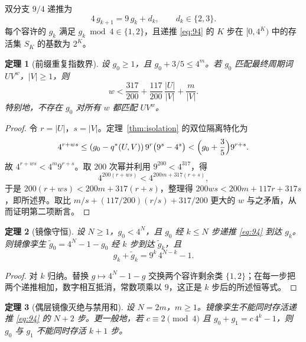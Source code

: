\documentclass[11pt,a4paper]{article}
\newtheorem{theorem}{定理}[section]
\theoremstyle{remark}
\begin{document}
双分支 $9/4$ 递推为
\begin{equation}
  4\, g_{k+1} = 9\, g_{k} + d_{k}, \qquad d_{k} \in \{2,3\}.
  \label{eq:94}
\end{equation}
每个容许的 $g_{k}$ 满足 $g_{k} \bmod 4 \in \{1,2\}$，且递推 \eqref{eq:94} 的 $K$ 步在 $[0,4^{K})$ 中的存活集 $S_{K}$ 的基数为 $2^{K}$。

\begin{theorem}[前缀重复指数界]
\label{thm:94rep}
设 $g_{0} \ge 1$，且 $g_{0} + 3/5 \le 4^{m}$。若 $g_{0}$ 匹配最终周期词 $U V^{w}$，$|V| \ge 1$，则
\[
  w < \frac{317}{200} + \frac{117}{200}\,\frac{|U|}{|V|} + \frac{m}{|V|}.
\]
特别地，不存在 $g_{0}$ 对所有 $w$ 都匹配 $U V^{w}$。
\end{theorem}

\begin{proof}
令 $r = |U|$，$s = |V|$。定理~\ref{thm:isolation} 的双位隔离特化为
\[
  4^{r+ws} \le (g_{0} - q^{*}(U,V))\, 9^{r}\bigl(9^{s} - 4^{s}\bigr) < \Bigl(g_{0} + \frac35\Bigr) 9^{r+s}.
\]
故 $4^{r+ws} < 4^{m} 9^{r+s}$。取 $200$ 次幂并利用 $9^{200} < 4^{317}$，得
\[
  4^{200(r+ws)} < 4^{200m + 317(r+s)},
\]
于是 $200(r+ws) < 200m + 317(r+s)$，整理得 $200ws < 200m + 117r + 317s$，即所述界。取比 $m/s + (117/200)(r/s) + 317/200$ 更大的 $w$ 与之矛盾，从而证明第二项断言。
\end{proof}

\begin{theorem}[镜像守恒]
\label{thm:mirror}
设 $N \ge 1$，$g_{0} < 4^{N}$，且 $g_{0}$ 经 $k \le N$ 步递推 \eqref{eq:94} 到达 $g_{k}$。则镜像孪生 $\tilde g_{0} = 4^{N} - 1 - g_{0}$ 经 $k$ 步到达 $\tilde g_{k}$，且
\[
  g_{k} + \tilde g_{k} = 9^{k}\, 4^{N-k} - 1.
\]
\end{theorem}

\begin{proof}
对 $k$ 归纳。替换 $g \mapsto 4^{N} - 1 - g$ 交换两个容许剩余类 $\{1,2\}$；在每一步把两个递推相加，数字相互抵消，常数项乘以 $9$，这正是 $k$ 步后的所述恒等式。
\end{proof}

\begin{theorem}[偶层镜像灭绝与禁用和]
\label{thm:evenlevel}
设 $N = 2m$，$m \ge 1$。镜像孪生不能同时存活递推 \eqref{eq:94} 的 $N+2$ 步。更一般地，若 $c \equiv 2 \pmod 4$ 且 $g_{0} + g_{1} = c\,4^{k} - 1$，则 $g_{0}$ 与 $g_{1}$ 不能同时存活 $k+1$ 步。
\end{theorem}
\end{document}
